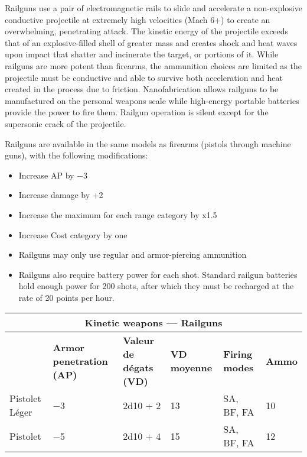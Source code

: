 {{Railguns use a pair of electromagnetic rails to slide and accelerate a non-explosive conductive projectile at extremely high velocities (Mach 6+) to create an overwhelming, penetrating attack. The kinetic energy of the projectile exceeds that of an explosive-filled shell of greater mass and creates shock and heat waves upon impact that shatter and incinerate the target, or portions of it. While railguns are more potent than firearms, the ammunition choices are limited as the projectile must be conductive and able to survive both acceleration and heat created in the process due to friction. Nanofabrication allows railguns to be manufactured on the personal weapons scale while high-energy portable batteries provide the power to fire them. Railgun operation is silent except for the supersonic crack of the projectile. 

Railguns are available in the same models as firearms (pistols through machine guns), with the following modifications: 

\begin{itemize} \item Increase AP by $-$3 \item Increase damage by +2 \item Increase the maximum for each range category by x1.5 \item Increase Cost category by one \item Railguns may only use regular and armor-piercing ammunition \item Railguns also require battery power for each shot. Standard railgun batteries hold enough power for 200 shots, after which they must be recharged at the rate of 20 points per hour. \end{itemize} 

\begin{table} \begin{tabularx}{\textwidth}{|l|X|X|X|X|l|} \hline

\multicolumn{6}{|c|}{\textbf{Kinetic weapons --- Railguns}} \\ \hline

&\textbf{Armor penetration (AP)}	&\textbf{Valeur de dégats (VD)}	&\textbf{VD moyenne}	&\textbf{Firing modes}	&\textbf{Ammo} \\ \hline

Pistolet Léger	&$-$3	&2d10 + 2	&13	&SA, BF, FA	&10 \\ \hline

Pistolet	&$-$5	&2d10 + 4	&15	&SA, BF, FA	&12 \\ \hline


\end{tabularx}
\end{table}}}
